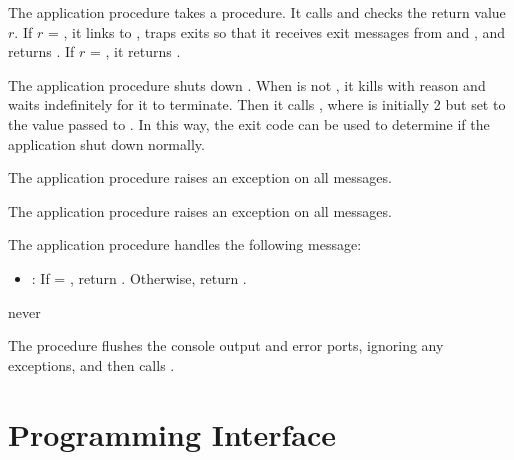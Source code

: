  The application  procedure
takes a  procedure. It calls  and
checks the return value $r$. If $r$ = ,
it links to , traps exits so that it receives exit
messages from  and , and
returns . If $r$ = , it returns .

 The application 
procedure shuts down . When  is not
, it kills  with reason  and
waits indefinitely for it to terminate. Then it calls
, where  is
initially 2 but set to the value passed to
. In this way, the exit code can be used
to determine if the application shut down normally.

 The application
 procedure raises an exception on all messages.

 The application
 procedure raises an exception on all messages.

 The application
 procedure handles the following message:\antipar

\begin{itemize}
\item {}: If  =
  , return . Otherwise,
  return .
\end{itemize}

\begin{procedure}
\end{procedure}
\returns{} never

The  procedure flushes the console output and error
ports, ignoring any exceptions, and then calls .

\section {Programming Interface}

\begin{procedure}
\end{procedure}
\returns{} 

